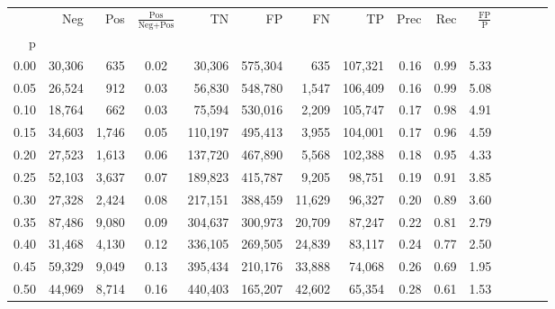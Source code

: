 \begin{tabular}{rrrcrrrrrrrrrrr}
\toprule
{} &     Neg &     Pos & $\frac{\text{Pos}}{\text{Neg}+\text{Pos}}$ &       TN &       FP &       FN &       TP &  Prec &   Rec & $\frac{\text{FP}}{\text{P}}$ \\
p    &         &         &                                            &          &          &          &          &       &       &                              \\
\midrule
0.00 &  30,306 &     635 &                                       0.02 &   30,306 &  575,304 &      635 &  107,321 &  0.16 &  0.99 &                         5.33 \\
0.05 &  26,524 &     912 &                                       0.03 &   56,830 &  548,780 &    1,547 &  106,409 &  0.16 &  0.99 &                         5.08 \\
0.10 &  18,764 &     662 &                                       0.03 &   75,594 &  530,016 &    2,209 &  105,747 &  0.17 &  0.98 &                         4.91 \\
0.15 &  34,603 &   1,746 &                                       0.05 &  110,197 &  495,413 &    3,955 &  104,001 &  0.17 &  0.96 &                         4.59 \\
0.20 &  27,523 &   1,613 &                                       0.06 &  137,720 &  467,890 &    5,568 &  102,388 &  0.18 &  0.95 &                         4.33 \\
0.25 &  52,103 &   3,637 &                                       0.07 &  189,823 &  415,787 &    9,205 &   98,751 &  0.19 &  0.91 &                         3.85 \\
0.30 &  27,328 &   2,424 &                                       0.08 &  217,151 &  388,459 &   11,629 &   96,327 &  0.20 &  0.89 &                         3.60 \\
0.35 &  87,486 &   9,080 &                                       0.09 &  304,637 &  300,973 &   20,709 &   87,247 &  0.22 &  0.81 &                         2.79 \\
0.40 &  31,468 &   4,130 &                                       0.12 &  336,105 &  269,505 &   24,839 &   83,117 &  0.24 &  0.77 &                         2.50 \\
0.45 &  59,329 &   9,049 &                                       0.13 &  395,434 &  210,176 &   33,888 &   74,068 &  0.26 &  0.69 &                         1.95 \\
0.50 &  44,969 &   8,714 &                                       0.16 &  440,403 &  165,207 &   42,602 &   65,354 &  0.28 &  0.61 &                         1.53 \\

\end{tabular}
